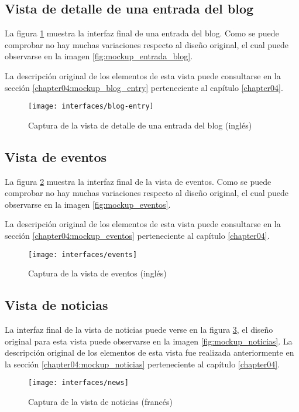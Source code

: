 \subsection{Vista de detalle de una entrada del blog}
La figura \ref{fig:interface_blog_entry} muestra la interfaz final de una entrada del blog.  Como se puede comprobar no hay muchas variaciones respecto al diseño original, el cual puede observarse en la imagen \ref{fig:mockup_entrada_blog}.

La descripción original de los elementos de esta vista puede consultarse en la sección \ref{chapter04:mockup_blog_entry} perteneciente al capítulo \ref{chapter04}.

\begin{figure}[h]
	\centering
	\texttt{[image: interfaces/blog-entry]}
	\caption{Captura de la vista de detalle de una entrada del blog (inglés)}
	\label{fig:interface_blog_entry}
\end{figure}

\subsection{Vista de eventos}
La figura \ref{fig:interface_eventos} muestra la interfaz final de la vista de eventos.  Como se puede comprobar no hay muchas variaciones respecto al diseño original, el cual puede observarse en la imagen \ref{fig:mockup_eventos}.

La descripción original de los elementos de esta vista puede consultarse en la sección \ref{chapter04:mockup_eventos} perteneciente al capítulo \ref{chapter04}.

\begin{figure}[h]
	\centering
	\texttt{[image: interfaces/events]}
	\caption{Captura de la vista de eventos (inglés)}
	\label{fig:interface_eventos}
\end{figure}


\subsection{Vista de noticias}
La interfaz final de la vista de noticias puede verse en la figura \ref{fig:interface_noticias}, el diseño original para esta vista puede observarse en la imagen \ref{fig:mockup_noticias}.  La descripción original de los elementos de esta vista fue realizada anteriormente en la sección  \ref{chapter04:mockup_noticias} perteneciente al capítulo \ref{chapter04}.

\begin{figure}[h]
	\centering
	\texttt{[image: interfaces/news]}
	\caption{Captura de la vista de noticias (francés)}
	\label{fig:interface_noticias}
\end{figure}


